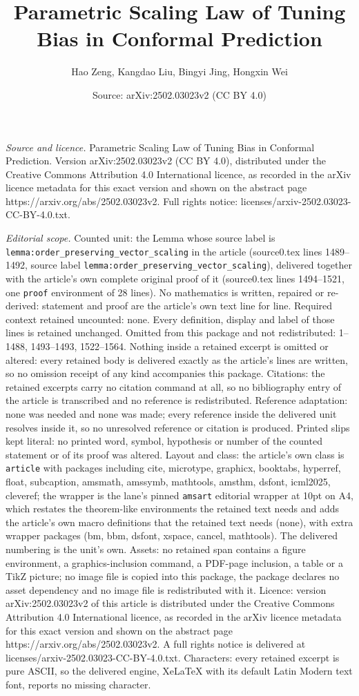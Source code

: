 \documentclass[10pt,a4paper]{amsart}
\title[Parametric Scaling Law of Tuning Bias in Conformal Predictio]{Parametric Scaling Law of Tuning Bias in Conformal Prediction}
\author{Hao Zeng, Kangdao Liu, Bingyi Jing, Hongxin Wei}
\date{Source: arXiv:2502.03023v2 (CC BY 4.0)}
\begin{document}
\maketitle

\noindent\emph{Source and licence.} Parametric Scaling Law of Tuning Bias in Conformal Prediction. Version arXiv:2502.03023v2 (CC BY 4.0), distributed under the Creative Commons Attribution 4.0 International licence, as recorded in the arXiv licence metadata for this exact version and shown on the abstract page https://arxiv.org/abs/2502.03023v2. Full rights notice: licenses/arxiv-2502.03023-CC-BY-4.0.txt.\par\smallskip

\noindent\textit{Editorial scope.} Counted unit: the Lemma whose source label is \texttt{lemma:order\_preserving\_vector\_scaling} in the article (source0.tex lines 1489--1492, source label \texttt{lemma:order\_preserving\_vector\_scaling}), delivered together with the article's own complete original proof of it (source0.tex lines 1494--1521, one \texttt{proof} environment of 28 lines). No mathematics is written, repaired or re-derived: statement and proof are the article's own text line for line. Required context retained uncounted: none. Every definition, display and label of those lines is retained unchanged. Omitted from this package and not redistributed: 1--1488, 1493--1493, 1522--1564. Nothing inside a retained excerpt is omitted or altered: every retained body is delivered exactly as the article's lines are written, so no omission receipt of any kind accompanies this package. Citations: the retained excerpts carry no citation command at all, so no bibliography entry of the article is transcribed and no reference is redistributed. Reference adaptation: none was needed and none was made; every reference inside the delivered unit resolves inside it, so no unresolved reference or citation is produced. Printed slips kept literal: no printed word, symbol, hypothesis or number of the counted statement or of its proof was altered. Layout and class: the article's own class is \texttt{article} with packages including cite, microtype, graphicx, booktabs, hyperref, float, subcaption, amsmath, amssymb, mathtools, amsthm, dsfont, icml2025, cleveref; the wrapper is the lane's pinned \texttt{amsart} editorial wrapper at 10pt on A4, which restates the theorem-like environments the retained text needs and adds the article's own macro definitions that the retained text needs (none), with extra wrapper packages (bm, bbm, dsfont, xspace, cancel, mathtools). The delivered numbering is the unit's own. Assets: no retained span contains a figure environment, a graphics-inclusion command, a PDF-page inclusion, a table or a TikZ picture; no image file is copied into this package, the package declares no asset dependency and no image file is redistributed with it. Licence: version arXiv:2502.03023v2 of this article is distributed under the Creative Commons Attribution 4.0 International licence, as recorded in the arXiv licence metadata for this exact version and shown on the abstract page https://arxiv.org/abs/2502.03023v2. A full rights notice is delivered at licenses/arxiv-2502.03023-CC-BY-4.0.txt. Characters: every retained excerpt is pure ASCII, so the delivered engine, XeLaTeX with its default Latin Modern text font, reports no missing character.
\end{document}
